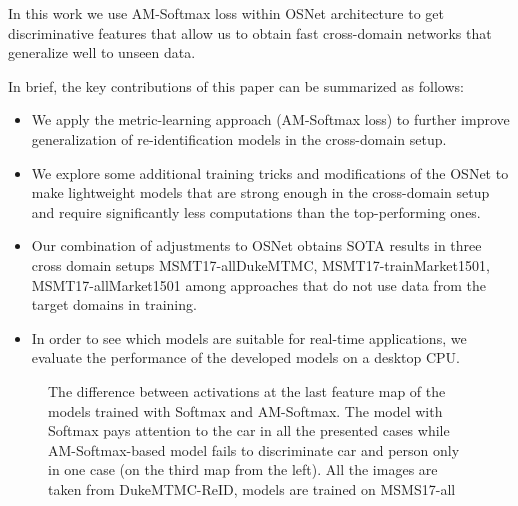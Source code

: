 \documentclass[a4paper,conference]{IEEEtran}
\begin{document}
In this work we use AM-Softmax \cite{amSoftmax} loss within OSNet
\cite{zhou2019osnet} architecture to get discriminative features that allow us
to obtain fast cross-domain networks that generalize well to unseen data.

In brief, the key contributions of this paper can be summarized as follows:

\begin{itemize}
  \item We apply the metric-learning approach (AM-Softmax \cite{amSoftmax} loss)
    to further improve generalization of re-identification models in the
    cross-domain setup.

    \item We explore some additional training tricks and modifications of the
    OSNet to make lightweight models that are strong enough in the cross-domain
    setup and require significantly less computations than the top-performing
    ones.

  \item Our combination of adjustments to OSNet obtains SOTA results in three
    cross domain setups MSMT17-allDukeMTMC,
    MSMT17-trainMarket1501, MSMT17-allMarket1501
    among approaches that do not use data from
    the target domains in training.

  \item In order to see which models are suitable for real-time applications, we
    evaluate the performance of the developed models on a desktop CPU.

\end{itemize}

\begin{figure*}[ht]
  \centering

  \caption{The difference between activations at the last feature map of the models trained with
           Softmax and AM-Softmax. The model with Softmax pays attention to the car in all the presented cases
           while AM-Softmax-based model fails to discriminate car and person only in one case (on the third map from the left).
           All the images are taken from DukeMTMC-ReID, models are trained on MSMS17-all}
  \label{fig:actmaps}
\end{figure*}
\end{document}
